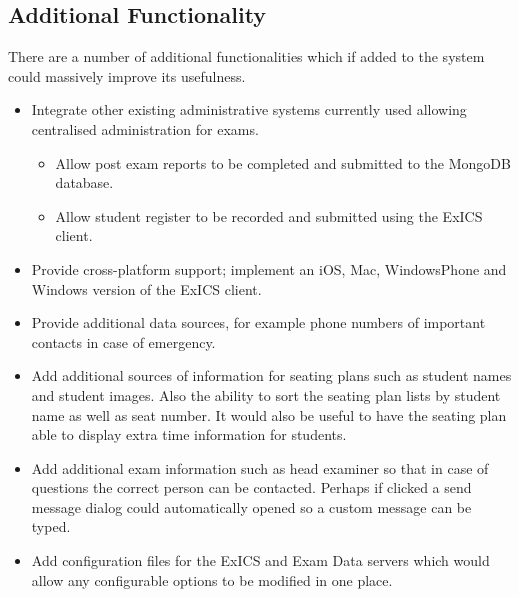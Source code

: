 \subsection{Additional Functionality}

There are a number of additional functionalities which if added to the system could massively improve its usefulness.

\begin{itemize}

	\item Integrate other existing administrative systems currently used allowing centralised administration for exams.\\
		\begin{itemize}

			\item Allow post exam reports to be completed and submitted to the MongoDB database.

			\item Allow student register to be recorded and submitted using the ExICS client.

		\end{itemize}

	\item Provide cross-platform support; implement an iOS, Mac, WindowsPhone and Windows version of the ExICS client.

	\item Provide additional data sources, for example phone numbers of important contacts in case of emergency.

	\item Add additional sources of information for seating plans such as student names and student images.  Also the ability to sort the seating plan lists by student name as well as seat number.  It would also be useful to have the seating plan able to display extra time information for students.

	\item Add additional exam information such as head examiner so that in case of questions the correct person can be contacted.  Perhaps if clicked a send message dialog could automatically opened so a custom message can be typed.

	\item Add configuration files for the ExICS and Exam Data servers which would allow any configurable options to be modified in one place.

\end{itemize}